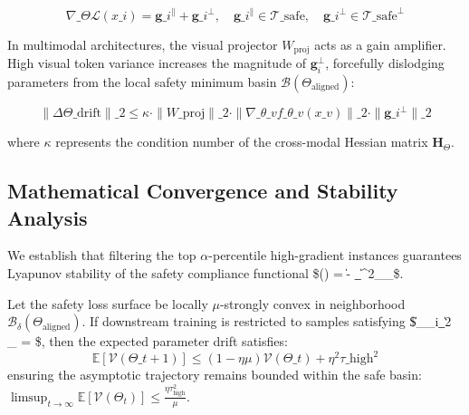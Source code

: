 \documentclass[10pt,journal,compsoc,twocolumn]{IEEEtran}
\begin{document}
\begin{table}[t]
\begin{equation}
\label{eq:grad\_decomposition}
\nabla\_\Theta \mathcal{L}(x\_i) = \mathbf{g}\_i^{\parallel} + \mathbf{g}\_i^{\perp}, \quad \mathbf{g}\_i^{\parallel} \in \mathcal{T}\_{\text{safe}}, \quad \mathbf{g}\_i^{\perp} \in \mathcal{T}\_{\text{safe}}^{\perp}
\end{equation}

In multimodal architectures, the visual projector $W_{\text{proj}}$ acts as a gain amplifier. High visual token variance increases the magnitude of $\mathbf{g}_i^{\perp}$, forcefully dislodging parameters from the local safety minimum basin $\mathcal{B}(\Theta_{\text{aligned}})$:

\begin{equation}
\label{eq:reversion\_bound}
\|\Delta \Theta\_{\text{drift}}\|\_2 \le \kappa \cdot \|W\_{\text{proj}}\|\_2 \cdot \|\nabla\_{\theta\_v} f\_{\theta\_v}(x\_v)\|\_2 \cdot \|\mathbf{g}\_i^{\perp}\|\_2
\end{equation}

where $\kappa$ represents the condition number of the cross-modal Hessian matrix $\mathbf{H}_{\Theta}$.


\subsection{Mathematical Convergence and Stability Analysis}

We establish that filtering the top $\alpha$-percentile high-gradient instances guarantees Lyapunov stability of the safety compliance functional \$(\Theta) = \|\Theta - \Theta\_{}\|^2\_{\_{}}\$.

Let the safety loss surface be locally $\mu$-strongly convex in neighborhood $\mathcal{B}_\delta(\Theta_{\text{aligned}})$. If downstream training is restricted to samples satisfying \$\|\nabla\_\Theta {}\_i\|\_2 \le \tau\_{} = \sqrt{2\mu \epsilon}\$, then the expected parameter drift satisfies:
\begin{equation}
\label{eq:lyapunov\_bound}
\mathbb{E}\left[ \mathcal{V}(\Theta\_{t+1}) \right] \le (1 - \eta \mu) \mathcal{V}(\Theta\_t) + \eta^2 \tau\_{\text{high}}^2
\end{equation}
ensuring the asymptotic trajectory remains bounded within the safe basin: $\limsup_{t \to \infty} \mathbb{E}[\mathcal{V}(\Theta_t)] \le \frac{\eta \tau_{\text{high}}^2}{\mu}$.





\end{table}
\end{document}
